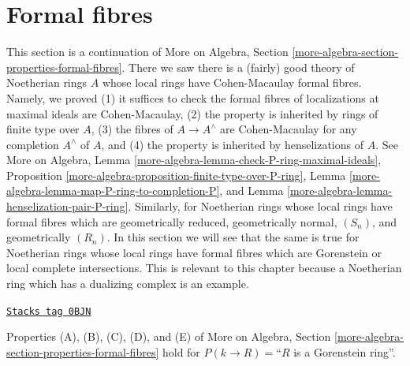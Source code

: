 \section{Formal fibres}
\label{dualizing-section-formal-fibres}
This section is a continuation of
More on Algebra, Section \ref{more-algebra-section-properties-formal-fibres}.
There we saw there is a (fairly) good theory of Noetherian rings $A$
whose local rings have Cohen-Macaulay formal fibres. Namely, we proved
(1) it suffices to check the formal fibres of localizations at
maximal ideals are Cohen-Macaulay,
(2) the property is inherited by rings of finite type over $A$,
(3) the fibres of $A \to A^\wedge$ are Cohen-Macaulay for
any completion $A^\wedge$ of $A$, and
(4) the property is inherited by henselizations of $A$. See
More on Algebra, Lemma \ref{more-algebra-lemma-check-P-ring-maximal-ideals},
Proposition \ref{more-algebra-proposition-finite-type-over-P-ring},
Lemma \ref{more-algebra-lemma-map-P-ring-to-completion-P}, and
Lemma \ref{more-algebra-lemma-henselization-pair-P-ring}.
Similarly, for Noetherian rings whose local rings have formal fibres
which are geometrically reduced, geometrically normal, $(S_n)$, and
geometrically $(R_n)$.
In this section we will see that the same is true for Noetherian rings
whose local rings have formal fibres which are Gorenstein
or local complete intersections.
This is relevant to this chapter because a Noetherian ring which has a
dualizing complex is an example.

\begin{lemma}
\label{dualizing-lemma-formal-fibres-gorenstein}
\href{https://stacks.math.columbia.edu/tag/0BJN}{\texttt{Stacks tag 0BJN}}

Properties (A), (B), (C), (D), and (E) of
More on Algebra, Section \ref{more-algebra-section-properties-formal-fibres}
hold for $P(k \to R) =$``$R$ is a Gorenstein ring''.
\end{lemma}

